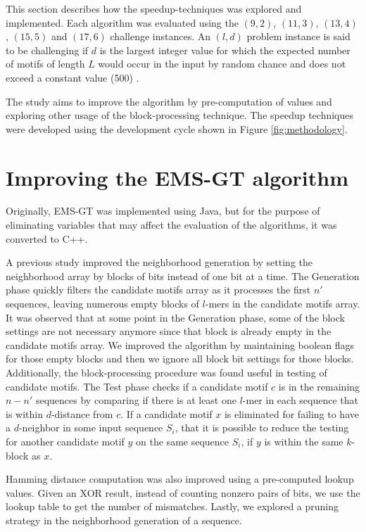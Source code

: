 This section describes how the speedup-techniques was explored and implemented. Each algorithm was evaluated using the $(9, 2)$, $(11, 3)$, $(13, 4)$, $(15, 5)$ and $(17, 6)$ challenge instances. An $(l, d)$ problem instance is said to be challenging if $d$ is the largest integer value for which the expected number of motifs of length $L$ would occur in the input by random chance and does not exceed a constant value (500) \cite{pms2015}.



The study aims to improve the algorithm by pre-computation of values and exploring other usage of the block-processing technique. The speedup techniques were developed using the development cycle shown in Figure \ref{fig:methodology}.

\section{Improving the EMS-GT algorithm}
Originally, EMS-GT was implemented using Java, but for the purpose of eliminating variables that may affect the evaluation of the algorithms, it was converted to C++. 

A previous study \cite{sia2015} improved the neighborhood generation by setting the neighborhood array by blocks of bits instead of one bit at a time. The Generation phase quickly filters the candidate motifs array as it processes the first $n'$ sequences, leaving numerous empty blocks of $l$-mers in the candidate motifs array. It was observed that at some point in the Generation phase, some of the block settings are not necessary anymore since that block is already empty in the candidate motifs array. We improved the algorithm by maintaining boolean flags for those empty blocks and then we ignore all block bit settings for those blocks. Additionally, the block-processing procedure was found useful in testing of candidate motifs. The Test phase checks if a candidate motif $c$ is in the remaining $n - n'$ sequences by comparing if there is at least one $l$-mer in each sequence that is within $d$-distance from $c$. If a candidate motif $x$ is eliminated for failing to have a $d$-neighbor in some input sequence $S_i$, that it is possible to reduce the testing for another candidate motif $y$ on the same sequence $S_i$, if $y$ is within the same $k$-block as $x$.

Hamming distance computation was also improved using a pre-computed lookup values. Given an XOR result, instead of counting nonzero pairs of bits, we use the lookup table to get the number of mismatches. Lastly, we explored a pruning strategy in the neighborhood generation of a sequence.

